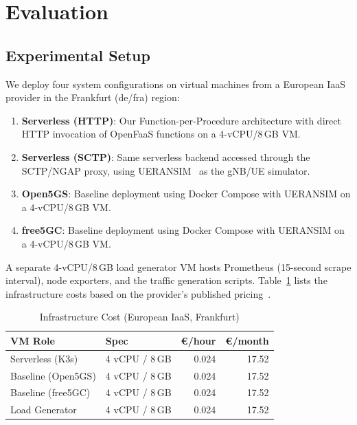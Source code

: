 \documentclass[conference]{IEEEtran}
\begin{document}
\section{Evaluation}
\label{sec:evaluation}

\subsection{Experimental Setup}

We deploy four system configurations on virtual machines from a European IaaS provider in the Frankfurt (de/fra) region:

\begin{enumerate}
    \item \textbf{Serverless (HTTP)}: Our Function-per-Procedure architecture with direct HTTP invocation of OpenFaaS functions on a 4-vCPU/8\,GB VM.
    \item \textbf{Serverless (SCTP)}: Same serverless backend accessed through the SCTP/NGAP proxy, using UERANSIM~\cite{ueransim} as the gNB/UE simulator.
    \item \textbf{Open5GS}: Baseline deployment using Docker Compose with UERANSIM on a 4-vCPU/8\,GB VM.
    \item \textbf{free5GC}: Baseline deployment using Docker Compose with UERANSIM on a 4-vCPU/8\,GB VM.
\end{enumerate}

A separate 4-vCPU/8\,GB load generator VM hosts Prometheus (15-second scrape interval), node exporters, and the traffic generation scripts. Table~\ref{tab:infra-cost} lists the infrastructure costs based on the provider's published pricing~\cite{cloud-pricing}.

\begin{table}[t]
\centering
\caption{Infrastructure Cost (European IaaS, Frankfurt)}
\label{tab:infra-cost}
\small
\begin{tabular}{@{}llrr@{}}
\toprule
\textbf{VM Role} & \textbf{Spec} & \textbf{\euro/hour} & \textbf{\euro/month} \\
\midrule
Serverless (K3s) & 4 vCPU / 8\,GB & 0.024 & 17.52 \\
Baseline (Open5GS) & 4 vCPU / 8\,GB & 0.024 & 17.52 \\
Baseline (free5GC) & 4 vCPU / 8\,GB & 0.024 & 17.52 \\
Load Generator & 4 vCPU / 8\,GB & 0.024 & 17.52 \\
\bottomrule
\end{tabular}
\end{table}
\end{document}
